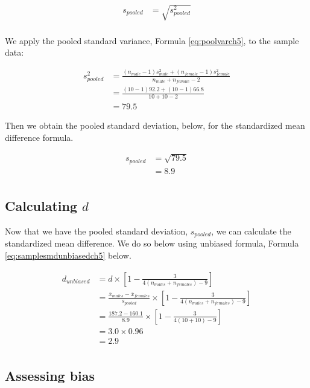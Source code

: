 \documentclass[
]{krantz}
\begin{document}
\[
\begin{aligned} 
s_{pooled}  &= \sqrt{s_{pooled}^2} \\
\end{aligned} 
\]

We apply the pooled standard variance, Formula \eqref{eq:poolvarch5}, to the sample data:

\[
\begin{aligned}
s_{pooled}^2 &= \frac{(n_{male} -1)s_{male}^2 + (n_{female} -1)s_{female}^2}{n_{male} + n_{female}-2} \\
&= \frac{(10 -1)92.2 + (10 -1)66.8}{10 + 10 -2} \\
&= 79.5
\end{aligned}
\]

Then we obtain the pooled standard deviation, below, for the standardized mean difference formula.

\[
\begin{aligned} 
s_{pooled}  &= \sqrt{79.5} \\
&= 8.9\\
\end{aligned} 
\]

\hypertarget{calculating-d}{%
\subsection{\texorpdfstring{Calculating \(d\)}{Calculating d}}\label{calculating-d}}

Now that we have the pooled standard deviation, \(s_{pooled}\), we can calculate the standardized mean difference. We do so below using unbiased formula, Formula \eqref{eq:samplesmdunbiasedch5} below.

\[
\begin{aligned}
d_{unbiased}  &= d \times [1 - \frac{3}{4(n_{males} + n_{females})-9}] \\
&= \frac{\bar{x}_{males} - \bar{x}_{females}}{s_{pooled}} \times [1 - \frac{3}{4(n_{males} + n_{females})-9}] \\
&= \frac{187.2 - 160.1}{8.9} \times [1 - \frac{3}{4(10 + 10)-9}] \\
&= 3.0 \times 0.96\\
&= 2.9\\
\end{aligned}
\]

\hypertarget{assessing-bias-2}{%
\subsection{Assessing bias}\label{assessing-bias-2}}
\end{document}
